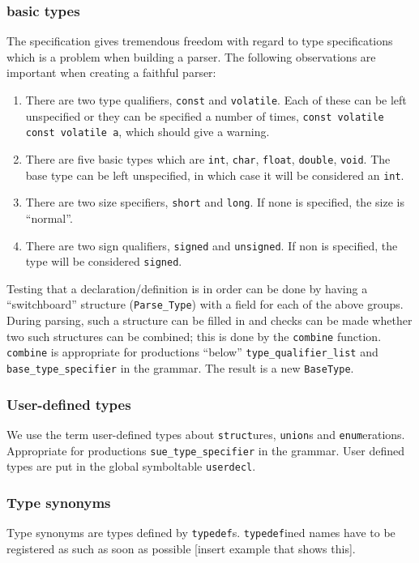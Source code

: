 \begin{docpart}
\subsubsection{basic types}
The \ansiC specification gives tremendous freedom with regard to type
specifications which is a problem when building a parser. The
following observations are important when creating a faithful \ansiC
parser:

\begin{enumerate}
  \item There are two type qualifiers, \texttt{const} and
    \texttt{volatile}. Each of these can be left unspecified or they can
    be specified a number of times, \eg \texttt{const volatile const
      volatile a}, which should give a warning.
  \item There are five basic types which are \texttt{int},
    \texttt{char}, \texttt{float}, \texttt{double}, \texttt{void}. The
    base type can be left unspecified, in which case it will be
    considered an \texttt{int}.
  \item There are two size specifiers, \texttt{short} and
    \texttt{long}. If none is specified, the size is ``normal''.
  \item There are two sign qualifiers, \texttt{signed} and
    \texttt{unsigned}. If non is specified, the type will be
    considered \texttt{signed}.
\end{enumerate}

Testing that a declaration/definition is in order can be done by
having a ``switchboard'' structure (\texttt{Parse\_Type}) with a field
for each of the above groups. During parsing, such a structure can be
filled in and checks can be made whether two such structures can be
combined; this is done by the \texttt{combine} function.
\texttt{combine} is appropriate for productions ``below''
\texttt{type\_qualifier\_list} and \texttt{base\_type\_specifier} in
the grammar.  The result is a new \texttt{BaseType}.

\subsubsection{User-defined types}
We use the term user-defined types about \texttt{struct}ures,
\texttt{union}s and \texttt{enum}erations.  Appropriate for
productions \texttt{sue\_type\_specifier} in the grammar. User defined
types are put in the global symboltable \texttt{userdecl}.

\subsubsection{Type synonyms}
Type synonyms are types defined by \texttt{typedef}s.
\texttt{typedef}ined names have to be registered as such as soon as
possible [insert example that shows this].


\end{docpart}
